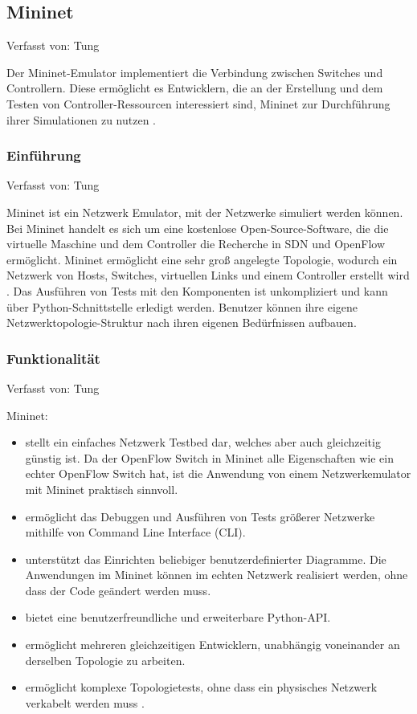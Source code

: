 \documentclass[fontsize=12pt,paper=a4,open=any,parskip=half,
  twoside=false,toc=listof,toc=bibliography,fleqn,leqno,
  captions=nooneline,captions=tableabove,british]{scrbook}
\begin{document}
\subsection{Mininet}
{\tiny Verfasst von: Tung\par}
Der Mininet-Emulator implementiert die Verbindung zwischen Switches und Controllern. Diese ermöglicht es Entwicklern, die an der Erstellung und dem Testen von Controller-Ressourcen interessiert sind, Mininet zur Durchführung ihrer Simulationen zu nutzen \cite{mininetoverview}.

\subsubsection{Einführung}
{\tiny Verfasst von: Tung\par}
Mininet ist ein Netzwerk Emulator, mit der Netzwerke simuliert werden können. Bei Mininet handelt es sich um eine kostenlose Open-Source-Software, die die virtuelle Maschine und dem Controller die Recherche in SDN und OpenFlow ermöglicht. Mininet ermöglicht eine sehr groß angelegte Topologie, wodurch ein Netzwerk von Hosts, Switches, virtuellen Links und einem Controller erstellt wird \cite[139]{mininetdefinition}. Das Ausführen von Tests mit den Komponenten ist unkompliziert und kann über Python-Schnittstelle erledigt werden. Benutzer können ihre eigene Netzwerktopologie-Struktur nach ihren eigenen Bedürfnissen aufbauen\cite[141]{mininetdefinition}.

\subsubsection{Funktionalität}
{\tiny Verfasst von: Tung\par}
Mininet:
\begin{itemize}
 \item stellt ein einfaches Netzwerk Testbed dar, welches aber auch gleichzeitig günstig ist. Da der OpenFlow Switch in Mininet alle Eigenschaften wie ein echter OpenFlow Switch hat, ist die Anwendung von einem Netzwerkemulator mit Mininet praktisch sinnvoll.
 \item ermöglicht das Debuggen und Ausführen von Tests größerer Netzwerke mithilfe von Command Line Interface (CLI).
 \item unterstützt das Einrichten beliebiger benutzerdefinierter Diagramme. Die Anwendungen im Mininet können im echten Netzwerk realisiert werden, ohne dass der Code geändert werden muss.
 \item bietet eine benutzerfreundliche und erweiterbare Python-API.
 \item ermöglicht mehreren gleichzeitigen Entwicklern, unabhängig voneinander an derselben Topologie zu arbeiten.
 \item ermöglicht komplexe Topologietests, ohne dass ein physisches Netzwerk verkabelt werden muss \cite{mininetoverview}.
\end{itemize}
\end{document}
